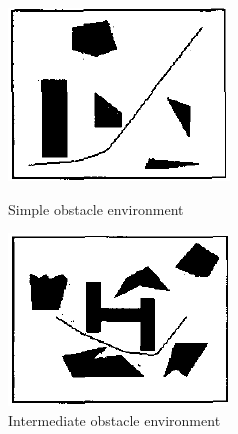 \begin{figure}[h!]
    \centering
    \begin{minipage}{0.30\textwidth}
        \centering
        \includegraphics[width=\linewidth]{images/Chap1/R17_simple.png} %
        \caption{Simple obstacle environment       }
        \label{Simple obstacle environment}
    \end{minipage}
    \begin{minipage}{0.30\textwidth}
        \centering
        \includegraphics[width=\linewidth]{images/Chap1/R17_intermediate.png} %
        \caption{Intermediate obstacle environment}

\end{minipage}
\end{figure}
